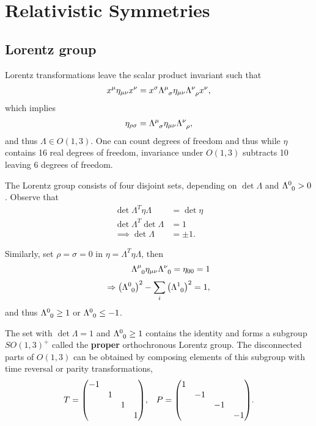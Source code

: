 \section{Relativistic Symmetries}

\subsection{Lorentz group}

Lorentz transformations leave the scalar product invariant such that
\begin{align}
    x^{\mu} \eta_{\mu\nu} x^{\nu} = x^{\sigma} \tensor{\Lambda}{^{\mu}_\sigma} \eta_{\mu \nu} \tensor{\Lambda}{^{\nu}_\rho} x^{\nu}
,\end{align}
which implies
\begin{align}
    \eta_{\rho \sigma} = \tensor{\Lambda}{^{\mu}_\sigma} \eta_{\mu \nu} \tensor{\Lambda}{^{\nu}_{\rho}}
,\end{align}
and thus $\Lambda \in O \left( 1,3 \right) $. One can count degrees of freedom and thus while $\eta$ contains 16 real degrees of freedom, invariance under $O \left( 1,3 \right) $ subtracts 10 leaving 6 degrees of freedom.

The Lorentz group consists of four disjoint sets, depending on $\det \Lambda $ and $\tensor{\Lambda}{^{0}_0} > 0$. Observe that
\begin{align}
    \det \Lambda^{T} \eta \Lambda &= \det \eta \\
    \det \Lambda^{T} \det \Lambda &= 1 \\
    \implies \det \Lambda &= \pm 1
.\end{align}

Similarly, set $\rho = \sigma = 0$ in $\eta = \Lambda^{T} \eta \Lambda$, then
\begin{align}
    \tensor{\Lambda}{^{\mu}_0} \eta_{\mu \nu} \tensor{\Lambda}{^{\nu}_0} = \eta_{0 0} = 1 \\
    \implies \left( \tensor{\Lambda}{^{0}_0} \right)^2 - \sum_{i}^{}  \left( \tensor{\Lambda}{^{1}_0} \right)^2 = 1
,\end{align}
and thus $\tensor{\Lambda}{^{0}_0} \geq 1$ or $\tensor{\Lambda}{^{0}_0} \leq -1$.

The set with $\det \Lambda = 1$ and $\tensor{\Lambda}{^{0}_0} \geq 1$ contains the identity and forms a subgroup $SO \left( 1,3 \right)^{+}$ called the \textbf{proper} orthochronous Lorentz group. The disconnected parts of $O \left( 1,3 \right) $ can be obtained by composing elements of this subgroup with time reversal or parity transformations,
\begin{align}
    T = \mqty( -1 \\ & 1 \\ & & 1 \\ &  & & 1), && P = \mqty( 1 \\ & -1 \\ & & -1 \\ & & & -1 )
.\end{align}

